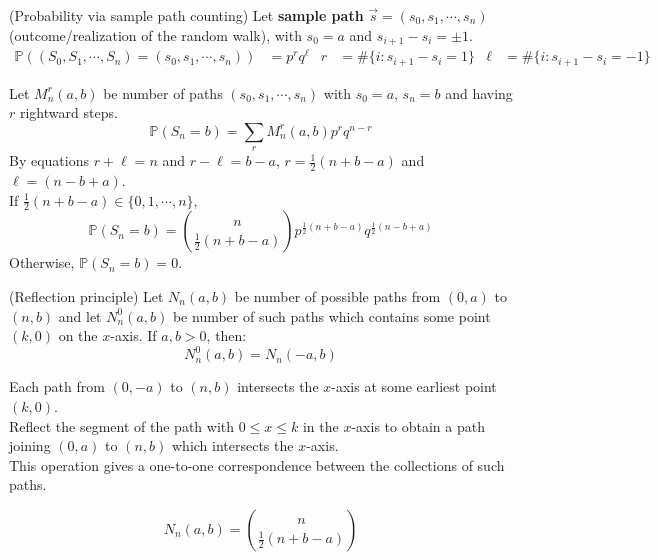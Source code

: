 \documentclass{huhtakm-template-book}
\newcommand{\prob}{\mathbb{P}}
\begin{document}
    \begin{eg}(Probability via sample path counting)
        Let \textbf{sample path} $\vec{s}=(s_{0},s_{1},\cdots,s_{n})$ (outcome/realization of the random walk), with $s_{0}=a$ and $s_{i+1}-s_{i}=\pm 1$.
        \begin{align*}
            \prob((S_{0},S_{1},\cdots,S_{n})=(s_{0},s_{1},\cdots,s_{n}))&=p^{r}q^{\ell} & r&=\#\{i:s_{i+1}-s_{i}=1\} & \ell&=\#\{i:s_{i+1}-s_{i}=-1\}
        \end{align*}
    \end{eg}
    \begin{eg}
        Let $M_{n}^{r}(a,b)$ be number of paths $(s_{0},s_{1},\cdots,s_{n})$ with $s_{0}=a$, $s_{n}=b$ and having $r$ rightward steps.
        \begin{equation*}
            \prob(S_{n}=b)=\sum_{r} M_{n}^{r}(a,b)p^{r}q^{n-r}
        \end{equation*}
        By equations $r+\ell=n$ and $r-\ell=b-a$, $r=\frac{1}{2}(n+b-a)$ and $\ell=(n-b+a)$.\\
        If $\frac{1}{2}(n+b-a)\in\{0,1,\cdots,n\}$,
        \begin{equation*}
            \prob(S_{n}=b)=\binom{n}{\frac{1}{2}(n+b-a)}p^{\frac{1}{2}(n+b-a)}q^{\frac{1}{2}(n-b+a)}
        \end{equation*}
        Otherwise, $\prob(S_{n}=b)=0$.
    \end{eg}
    \begin{thm}(Reflection principle)
        Let $N_{n}(a,b)$ be number of possible paths from $(0,a)$ to $(n,b)$ and let $N_{n}^{0}(a,b)$ be number of such paths which contains some point $(k,0)$ on the $x$-axis. If $a,b>0$, then:
        \begin{equation*}
            N_{n}^{0}(a,b)=N_{n}(-a,b)
        \end{equation*}
    \end{thm}
    \begin{proofing}
        Each path from $(0,-a)$ to $(n,b)$ intersects the $x$-axis at some earliest point $(k,0)$.\\
        Reflect the segment of the path with $0\leq x\leq k$ in the $x$-axis to obtain a path joining $(0,a)$ to $(n,b)$ which intersects the $x$-axis.\\
        This operation gives a one-to-one correspondence between the collections of such paths.
    \end{proofing}
    \begin{lem}
        \label{Number of paths calculation}
        \begin{equation*}
            N_{n}(a,b)=\binom{n}{\frac{1}{2}(n+b-a)}
        \end{equation*}
    \end{lem}
\end{document}

